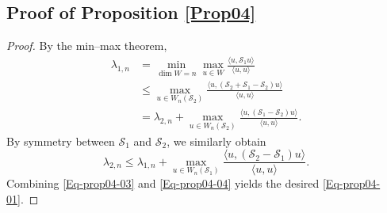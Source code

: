 \documentclass{sn-jnl}%
\numberwithin{equation}{section}
\theoremstyle{thmstyleone}%
\theoremstyle{thmstyletwo}%
\theoremstyle{thmstylethree}%
\begin{document}
\begin{appendices}
\section{Proof of Proposition \ref{Prop04}}\label{proofProp04}
\begin{proof}
    By the min–max theorem,
    \begin{equation}\label{Eq-prop04-03}
    \begin{aligned}
    \lambda_{1,n}
    &= \min_{\dim W = n} \max_{u \in W} \frac{\langle u, \mathcal{S}_1 u \rangle}{\langle u, u \rangle} \\
    &\leq \max_{u \in W_n(\mathcal{S}_2)} \frac{\langle u, (\mathcal{S}_2 + \mathcal{S}_1 - \mathcal{S}_2) u \rangle}{\langle u, u \rangle} \\
    &= \lambda_{2,n} + \max_{u \in W_n(\mathcal{S}_2)} \frac{\langle u, (\mathcal{S}_1 - \mathcal{S}_2) u \rangle}{\langle u, u \rangle}.
    \end{aligned}
    \end{equation}
    By symmetry between $\mathcal{S}_1$ and $\mathcal{S}_2$, we similarly obtain
    \begin{equation}\label{Eq-prop04-04}
    \lambda_{2,n} \leq \lambda_{1,n} + \max_{u \in W_n(\mathcal{S}_1)} \frac{\langle u, (\mathcal{S}_2 - \mathcal{S}_1) u \rangle}{\langle u, u \rangle}.
    \end{equation}
    Combining \eqref{Eq-prop04-03} and \eqref{Eq-prop04-04} yields the desired \eqref{Eq-prop04-01}.


\end{proof}
\end{appendices}
\end{document}
